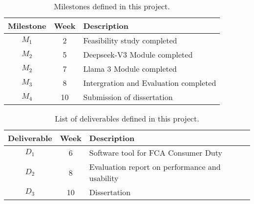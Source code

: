 \documentclass[a4paper,11pt]{article}
\begin{document}
\begin{table}[htbp]
    \begin{center}
        \begin{tabular}{|c|c|l|}
        \hline
        \textbf{Milestone} & \textbf{Week} & \textbf{Description} \\
        \hline
        $M_1$ & 2 & Feasibility study completed \\
        $M_2$ & 5 & Deepseek-V3 Module completed \\
        $M_2$ & 7 & Llama 3 Module completed \\
        $M_3$ & 8 & Intergration and Evaluation completed \\
        $M_4$ & 10 & Submission of dissertation \\
        \hline
        \end{tabular} 
    \end{center}
    \caption{Milestones defined in this project.}
    \label{fig:milestones}
\end{table}

\begin{table}[htbp]
    \begin{center}
        \begin{tabular}{|c|c|l|}
        \hline
        \textbf{Deliverable} & \textbf{Week} & \textbf{Description} \\
        \hline
        $D_1$ & 6 & Software tool for FCA Consumer Duty\\
        $D_2$ & 8 & Evaluation report on performance and usability \\
        $D_3$ & 10 & Dissertation \\
        \hline
        \end{tabular} 
    \end{center}
    \caption{List of deliverables defined in this project.}
    \label{fig:deliverables}
\end{table}



{\small
}
\end{document}
